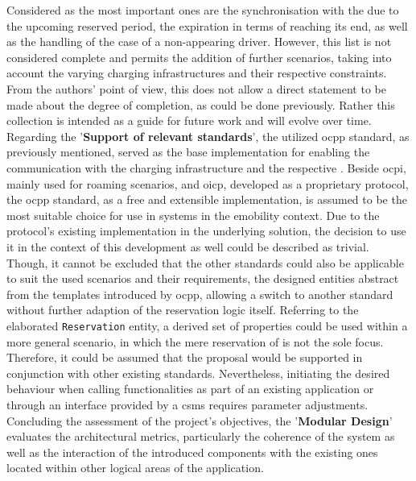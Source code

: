 Considered as the most important ones are the synchronisation with the  due to the upcoming reserved period, the expiration in terms of reaching its end, as well as the handling of the case of a non-appearing driver.
However, this list is not considered complete and permits the addition of further scenarios, taking into account the varying charging infrastructures and their respective constraints. 
From the authors' point of view, this does not allow a direct statement to be made about the degree of completion, as could be done previously. Rather this collection is intended as a guide for future work and will evolve over time.
Regarding the '\textbf{Support of relevant standards}', the utilized \acrshort{ocpp} standard, as previously mentioned, served as the base implementation for enabling the communication with the charging infrastructure and the respective .
Beside \acrshort{ocpi}, mainly used for roaming scenarios, and \acrshort{oicp}, developed as a proprietary protocol, the \acrshort{ocpp} standard, as a free and extensible implementation, is assumed to be the most suitable choice for use in systems in the \acrshort{emobility} context.
Due to the protocol's existing implementation in the underlying solution, the decision to use it in the context of this development as well could be described as trivial.
Though, it cannot be excluded that the other standards could also be applicable to suit the used scenarios and their requirements, the designed entities abstract from the templates introduced by \acrshort{ocpp}, allowing a switch to another standard without further adaption of the reservation logic itself.
Referring to the elaborated \texttt{Reservation} entity, a derived set of properties could be used within a more general scenario, in which the mere reservation of  is not the sole focus. Therefore, it could be assumed that the proposal would be supported in conjunction with other existing standards. 
Nevertheless, initiating the desired behaviour when calling functionalities as part of an existing application or through an interface provided by a \acrshort{csms} requires parameter adjustments.
Concluding the assessment of the project's objectives, the '\textbf{Modular Design}' evaluates the architectural metrics, particularly the coherence of the system as well as the interaction of the introduced components with the existing ones located within other logical areas of the application.
